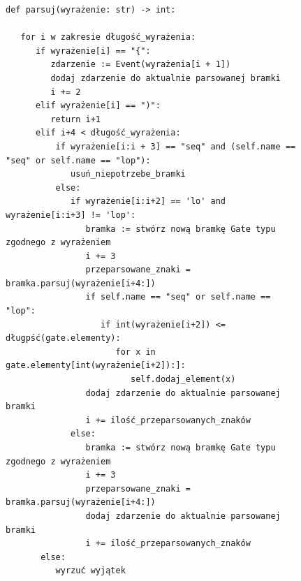 \begin{figure}[!ht]
\lstset{caption=Parser gramatyki, captionpos=b}
\lstset{label=src:passive, frame=single}
\begin{lstlisting}
def parsuj(wyrażenie: str) -> int:

   for i w zakresie długość_wyrażenia:
      if wyrażenie[i] == "{":
         zdarzenie := Event(wyrażenia[i + 1])
         dodaj zdarzenie do aktualnie parsowanej bramki 
         i += 2
      elif wyrażenie[i] == ")":
         return i+1
      elif i+4 < długość_wyrażenia:
          if wyrażenie[i:i + 3] == "seq" and (self.name == "seq" or self.name == "lop"):
             usuń_niepotrzebe_bramki
          else:
             if wyrażenie[i:i+2] == 'lo' and wyrażenie[i:i+3] != 'lop':  
                bramka := stwórz nową bramkę Gate typu zgodnego z wyrażeniem 
                i += 3
                przeparsowane_znaki = bramka.parsuj(wyrażenie[i+4:])
                if self.name == "seq" or self.name == "lop":
                   if int(wyrażenie[i+2]) <= długpść(gate.elementy):
                      for x in gate.elementy[int(wyrażenie[i+2]):]:
                         self.dodaj_element(x)
                dodaj zdarzenie do aktualnie parsowanej bramki 
                i += ilość_przeparsowanych_znaków
             else:
                bramka := stwórz nową bramkę Gate typu zgodnego z wyrażeniem 
                i += 3
                przeparsowane_znaki = bramka.parsuj(wyrażenie[i+4:])
                dodaj zdarzenie do aktualnie parsowanej bramki 
                i += ilość_przeparsowanych_znaków
       else:
          wyrzuć wyjątek
\end{lstlisting}
\end{figure}

